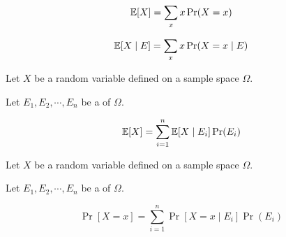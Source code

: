 
\begin{frame}{}
  \begin{definition}[Expectation]
    \[
      \operatorname*{\mathbb{E}}[X] = \sum_{x} x \Pr(X = x)
    \]
  \end{definition}

  \pause
  \vspace{0.60cm}
  \begin{definition}
    \[
      \operatorname*{\mathbb{E}}[X \mid E] = \sum_{x} x \Pr(X = x \mid E)
    \]
  \end{definition}
\end{frame}

\begin{frame}{}
  \begin{theorem}
    Let $X$ be a random variable defined on a sample space $\Omega$.

    Let $E_1, E_2, \cdots, E_n$ be a  of $\Omega$.

    \[
      \operatorname*{\mathbb{E}}[X] = \sum_{i=1}^{n} \operatorname*{\mathbb{E}}[X \mid E_i] \Pr(E_i)
    \]
  \end{theorem}

  \pause
  \vspace{0.30cm}
  \begin{theorem}
    Let $X$ be a random variable defined on a sample space $\Omega$.

    Let $E_1, E_2, \cdots, E_n$ be a  of $\Omega$.

    \[
      \Pr[X = x] = \sum_{i=1}^{n} \Pr[X = x \mid E_i] \Pr(E_i)
    \]
  \end{theorem}


\end{frame}

